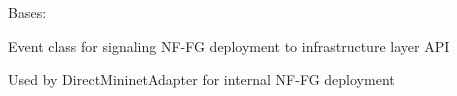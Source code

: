 \documentclass[letterpaper,10pt,english]{sphinxmanual}
\begin{document}

\begin{fulllineitems}
\label{util/adapter:escape.util.adapter.DeployEvent}
Bases: 

Event class for signaling NF-FG deployment to infrastructure layer API

Used by DirectMininetAdapter for internal NF-FG deployment

\begin{fulllineitems}
\label{util/adapter:escape.util.adapter.DeployEvent.__init__}
\end{fulllineitems}


\end{fulllineitems}

\end{document}
